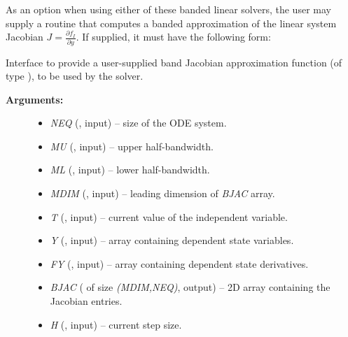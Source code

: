 \documentclass[letterpaper,10pt,english]{sphinxmanual}
\begin{document}
As an option when using either of these banded linear solvers, the user
may supply a routine that computes a banded approximation of the
linear system Jacobian $J = \frac{\partial f_I}{\partial y}$. If
supplied, it must have the following form:

\begin{fulllineitems}
\label{f_interface/Usage:f/_/FARKBJAC}
Interface to provide a user-supplied band Jacobian approximation
function (of type {\hyperref[c_interface/User_supplied:ARKDlsBandJacFn]{}}), to be used by the
{\hyperref[f_interface/Usage:f/_/FARKBAND]{}} solver.
\begin{description}
\item[{\textbf{Arguments:}}] \leavevmode\begin{itemize}
\item {} 
\emph{NEQ} (, input) -- size of the ODE system.

\item {} 
\emph{MU}   (, input) -- upper half-bandwidth.

\item {} 
\emph{ML}   (, input) -- lower half-bandwidth.

\item {} 
\emph{MDIM} (, input) -- leading dimension of \emph{BJAC} array.

\item {} 
\emph{T}    (, input) -- current value of the independent variable.

\item {} 
\emph{Y}    (, input) -- array containing dependent state variables.

\item {} 
\emph{FY}   (, input) -- array containing dependent state derivatives.

\item {} 
\emph{BJAC} ( of size \emph{(MDIM,NEQ)}, output) -- 2D array
containing the Jacobian entries.

\item {} 
\emph{H}    (, input) -- current step size.


\end{itemize}
\end{description}
\end{fulllineitems}
\end{document}
